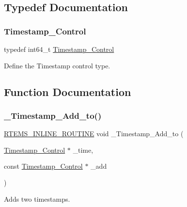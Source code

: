 \subsection{Typedef Documentation}
\mbox{\label{group__SuperCoreTimeStamp_ga8508036506d5211c98844c88045e2410}} 
\subsubsection{\texorpdfstring{Timestamp\_Control}{Timestamp\_Control}}
{\footnotesize\ttfamily typedef int64\+\_\+t \mbox{\hyperlink{group__SuperCoreTimeStamp_ga8508036506d5211c98844c88045e2410}{Timestamp\+\_\+\+Control}}}

Define the Timestamp control type. 

\subsection{Function Documentation}
\mbox{\label{group__SuperCoreTimeStamp_gaae6a0b857c8470d50286bc24aa812f4e}} 
\subsubsection{\texorpdfstring{\_Timestamp\_Add\_to()}{\_Timestamp\_Add\_to()}}
{\footnotesize\ttfamily \mbox{\hyperlink{group__RTEMSScoreBaseDefs_gac216239df231d5dbd15e3520b0b9313f}{R\+T\+E\+M\+S\+\_\+\+I\+N\+L\+I\+N\+E\+\_\+\+R\+O\+U\+T\+I\+NE}} void \+\_\+\+Timestamp\+\_\+\+Add\+\_\+to (\begin{DoxyParamCaption}\item[{\mbox{\hyperlink{group__SuperCoreTimeStamp_ga8508036506d5211c98844c88045e2410}{Timestamp\+\_\+\+Control}} $\ast$}]{\+\_\+time,  }\item[{const \mbox{\hyperlink{group__SuperCoreTimeStamp_ga8508036506d5211c98844c88045e2410}{Timestamp\+\_\+\+Control}} $\ast$}]{\+\_\+add }\end{DoxyParamCaption})}



Adds two timestamps. 

